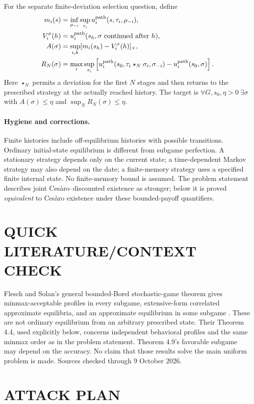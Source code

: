 \documentclass[11pt,a4paper]{article}
\theoremstyle{definition}
\theoremstyle{remark}
\begin{document}
For the separate finite-deviation selection question, define
\begin{align*}
 m_i(s)&=\inf_{\rho_{-i}}\sup_{\tau_i}u_i^{\rm path}(s,\tau_i,\rho_{-i}),\\
 V_i^\sigma(h)&=u_i^{\rm path}(s_h,\sigma\text{ continued after }h),\\
 A(\sigma)&=\sup_{i,h}[m_i(s_h)-V_i^\sigma(h)]_+,\\
 R_N(\sigma)&=\max_i\sup_{\tau_i}
 \left[u_i^{\rm path}(s_0,\tau_i\star_N\sigma_i,\sigma_{-i})
       -u_i^{\rm path}(s_0,\sigma)\right].
\end{align*}
Here $\star_N$ permits a deviation for the first $N$ stages and then returns to the prescribed strategy at the actually reached history. The target is
$\forall G,s_0,\eta>0\ \exists\sigma$ with $A(\sigma)\leq\eta$ and $\sup_NR_N(\sigma)\leq\eta$.

\paragraph{Hygiene and corrections.}
Finite histories include off-equilibrium histories with possible transitions. Ordinary initial-state equilibrium is different from subgame perfection. A stationary strategy depends only on the current state; a time-dependent Markov strategy may also depend on the date; a finite-memory strategy uses a specified finite internal state. No finite-memory bound is assumed. The problem statement describes joint Ces\`aro--discounted existence as stronger; below it is proved \emph{equivalent} to Ces\`aro existence under these bounded-payoff quantifiers.

\section{QUICK LITERATURE/CONTEXT CHECK}
Flesch and Solan's general bounded-Borel stochastic-game theorem gives minmax-acceptable profiles in every subgame, extensive-form correlated approximate equilibria, and an approximate equilibrium in some subgame \cite{c731-fs}. These are not ordinary equilibrium from an arbitrary prescribed state. Their Theorem 4.4, used explicitly below, concerns independent behavioral profiles and the same minmax order as in the problem statement. Theorem 4.9's favorable subgame may depend on the accuracy. No claim that those results solve the main uniform problem is made. Sources checked through 9 October 2026.

\section{ATTACK PLAN}
\end{document}
